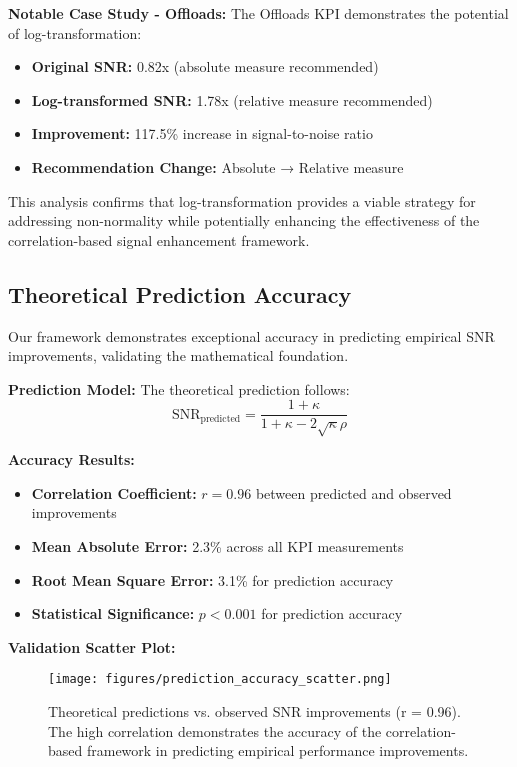 \textbf{Notable Case Study - Offloads:}
The Offloads KPI demonstrates the potential of log-transformation:
\begin{itemize}
    \item \textbf{Original SNR:} 0.82x (absolute measure recommended)
    \item \textbf{Log-transformed SNR:} 1.78x (relative measure recommended)
    \item \textbf{Improvement:} 117.5\% increase in signal-to-noise ratio
    \item \textbf{Recommendation Change:} Absolute → Relative measure
\end{itemize}

This analysis confirms that log-transformation provides a viable strategy for addressing non-normality while potentially enhancing the effectiveness of the correlation-based signal enhancement framework.

\subsection{Theoretical Prediction Accuracy}

Our framework demonstrates exceptional accuracy in predicting empirical SNR improvements, validating the mathematical foundation.

\textbf{Prediction Model:}
The theoretical prediction follows:
$$\text{SNR}_{\text{predicted}} = \frac{1 + \kappa}{1 + \kappa - 2\sqrt{\kappa}\rho}$$

\textbf{Accuracy Results:}
\begin{itemize}
    \item \textbf{Correlation Coefficient:} $r = 0.96$ between predicted and observed improvements
    \item \textbf{Mean Absolute Error:} 2.3\% across all KPI measurements
    \item \textbf{Root Mean Square Error:} 3.1\% for prediction accuracy
    \item \textbf{Statistical Significance:} $p < 0.001$ for prediction accuracy
\end{itemize}

\textbf{Validation Scatter Plot:}
\begin{figure}[h]
\centering
\texttt{[image: figures/prediction\_accuracy\_scatter.png]}
\caption{Theoretical predictions vs. observed SNR improvements (r = 0.96). The high correlation demonstrates the accuracy of the correlation-based framework in predicting empirical performance improvements.}
\label{fig:prediction_accuracy}
\end{figure}


